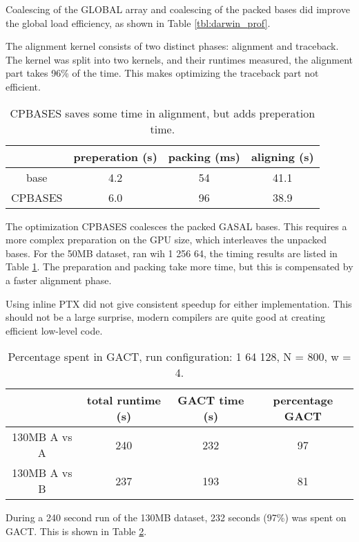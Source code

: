 \documentclass[../main/thesis.tex]{subfiles}
\begin{document}
Coalescing of the GLOBAL array and coalescing of the packed bases did improve the global load efficiency, as shown in Table \ref{tbl:darwin_prof}.

The alignment kernel consists of two distinct phases: alignment and traceback.
The kernel was split into two kernels, and their runtimes measured, the alignment part takes 96\% of the time.
This makes optimizing the traceback part not efficient.

\begin{table}
\centering
\caption{CPBASES saves some time in alignment, but adds preperation time.}
\label{tbl:CPBASES}
\begin{tabular}{c c c c}
& preperation (s) & packing (ms) & aligning (s) \\ \hline
base & 4.2 & 54 & 41.1 \\
CPBASES & 6.0 & 96 & 38.9 \\
\end{tabular}
\end{table}

The optimization CPBASES coalesces the packed GASAL bases.
This requires a more complex preparation on the GPU size, which interleaves the unpacked bases.
For the 50MB dataset, ran wih 1 256 64, the timing results are listed in Table \ref{tbl:CPBASES}.
The preparation and packing take more time, but this is compensated by a faster alignment phase.



Using inline PTX did not give consistent speedup for either implementation.
This should not be a large surprise, modern compilers are quite good at creating efficient low-level code.

\begin{table}
\centering
\label{tbl:darwin7}
\caption{Percentage spent in GACT, run configuration: 1 64 128, N = 800, w = 4.}
\begin{tabular}{c|c c c}
& total runtime (s) & GACT time (s) & percentage GACT \\ \hline
130MB A vs A & 240 & 232 & 97 \\
130MB A vs B & 237 & 193 & 81 \\
\end{tabular}
\end{table}

During a 240 second run of the 130MB dataset, 232 seconds (97\%) was spent on GACT.
This is shown in Table \ref{tbl:darwin7}.
\end{document}
